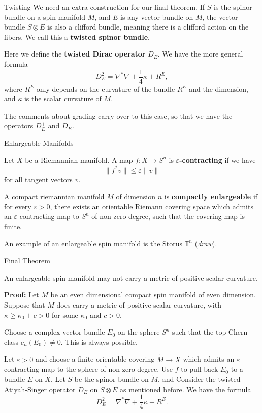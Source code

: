 \documentclass[11pt, reqno]{beamer}
\renewcommand{\epsilon}{\varepsilon}
\begin{document}
\begin{frame}{Twisting}
    We need an extra construction for our final theorem. If $S$ is the spinor bundle on a spin manifold $M$,
    and $E$ is any vector bundle on $M$, the vector bundle $S \otimes E$ is also a clifford bundle, meaning
    there is a clifford action on the fibers. We call this a \textbf{twisted spinor bundle}.
    
    \medskip
    Here we define the \textbf{twisted Dirac operator} $D_E$. We have the more general formula
    \[
        D_E^2 = \nabla^*\nabla + \frac{1}{4}\kappa + R^E,
    \]
    where $R^E$ only depends on the curvature of the bundle $R^E$ and the dimension, and $\kappa$ is the scalar curvature
    of $M$. 

    \medskip
    The comments about grading carry over to this case, so that we have the operators $D_E^+$ and $D_E^-$. 
\end{frame}

\begin{frame}{Enlargeable Manifolds}
    \begin{definition}
    Let $X$ be a Riemannian manifold. A map $f: X \to S^n$ is \textbf{$\epsilon$-contracting} if we have
    \[
        \|f^*v\| \leq \epsilon \|v\|
    \]
    for all tangent vectors $v$. 

    A compact riemannian manifold $M$ of dimension $n$ is \textbf{compactly enlargeable} if for every $\epsilon > 0$, there exists an orientable
    Riemann covering space which admits an $\epsilon$-contracting map to $S^n$ of non-zero degree, such that
    the covering map is finite.
    \end{definition}

    An example of an enlargeable spin manifold is the Storus $\mathbb{T}^n$ (\textit{draw}).
\end{frame}

\begin{frame}{Final Theorem}
    \begin{theorem}
    An enlargeable spin manifold may not carry a metric of positive scalar curvature. 
    \end{theorem}

    \textbf{Proof:} Let $M$ be an even dimensional compact spin manifold of even dimension.
    Suppose that $M$ does carry a metric 
    of positive scalar curvature, with $\kappa \geq \kappa_0 + c > 0$ for some $\kappa_0$ and $c > 0$. 

    Choose a complex vector bundle $E_0$ on the sphere $S^n$ such that the top Chern class $c_n(E_0) \neq 0$. 
    This is always possible.

    Let $\epsilon > 0$ and choose a finite orientable covering $\tilde{M} \to X$ which admits 
    an $\epsilon$-contracting map to the sphere of non-zero degree. Use $f$ to pull back $E_0$
    to a bundle $E$ on $\tilde{X}$. Let $S$ be the spinor bundle on $\tilde{M}$, 
    and Consider the twisted Atiyah-Singer operator $D_E$ on $S\otimes E$ 
    as mentioned before. We have the formula
    \[
        D_E^2 = \nabla^*\nabla + \frac{1}{4}\kappa + R^E.
    \]
\end{frame}
\end{document}
